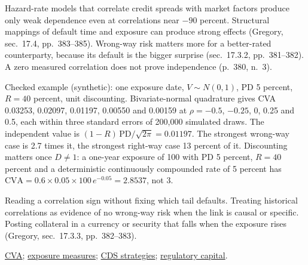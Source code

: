 \begin{qfdefinition}
 Hazard-rate models that correlate credit spreads with market factors produce only weak dependence even at correlations near $-90$ percent. Structural mappings of default time and exposure can produce strong effects (Gregory, sec.~17.4, pp.~383--385). Wrong-way risk matters more for a better-rated counterparty, because its default is the bigger surprise (sec.~17.3.2, pp.~381--382). A zero measured correlation does not prove independence (p.~380, n.~3).

 Checked example (synthetic): one exposure date, $V\sim N(0,1)$, PD 5 percent, $R=40$ percent, unit discounting. Bivariate-normal quadrature gives CVA 0.03253, 0.02097, 0.01197, 0.00550 and 0.00159 at $\rho=-0.5$, $-0.25$, 0, 0.25 and 0.5, each within three standard errors of 200{,}000 simulated draws. The independent value is $(1-R)\,\mathrm{PD}/\sqrt{2\pi}=0.01197$. The strongest wrong-way case is 2.7 times it, the strongest right-way case 13 percent of it. Discounting matters once $D\ne1$: a one-year exposure of 100 with PD 5 percent, $R=40$ percent and a deterministic continuously compounded rate of 5 percent has $\mathrm{CVA}=0.6\times0.05\times100\,e^{-0.05}=2.8537$, not 3.

 Reading a correlation sign without fixing which tail defaults. Treating historical correlations as evidence of no wrong-way risk when the link is causal or specific. Posting collateral in a currency or security that falls when the exposure rises (Gregory, sec.~17.3.3, pp.~382--383).

 \hyperref[meth:credit-valuation-adjustment]{CVA}; \hyperref[def:counterparty-exposure-measures]{exposure measures}; \hyperref[meth:cds-strategies]{CDS strategies}; \hyperref[rule:counterparty-credit-cva-capital]{regulatory capital}.

\end{qfdefinition}

